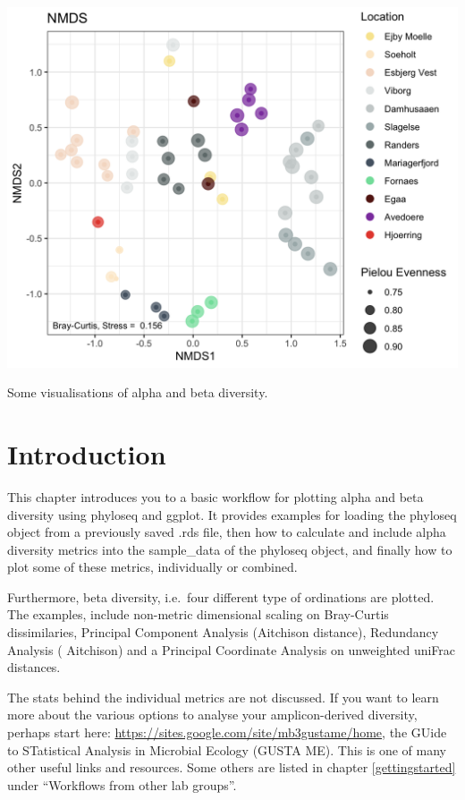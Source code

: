 \documentclass[
]{book}
\begin{document}
\includegraphics{./img/nmds-1.png}

Some visualisations of alpha and beta diversity.

\hypertarget{introduction-3}{%
\section{Introduction}\label{introduction-3}}

This chapter introduces you to a basic workflow for plotting alpha and beta diversity using phyloseq and ggplot. It provides examples for loading the phyloseq object from a previously saved .rds file, then how to calculate and include alpha diversity metrics into the sample\_data of the phyloseq object, and finally how to plot some of these metrics, individually or combined.

Furthermore, beta diversity, i.e.~four different type of ordinations are plotted. The examples, include non-metric dimensional scaling on Bray-Curtis dissimilaries, Principal Component Analysis (Aitchison distance), Redundancy Analysis ( Aitchison) and a Principal Coordinate Analysis on unweighted uniFrac distances.

The stats behind the individual metrics are not discussed. If you want to learn more about the various options to analyse your amplicon-derived diversity, perhaps start here: \url{https://sites.google.com/site/mb3gustame/home}, the GUide to STatistical Analysis in Microbial Ecology (GUSTA ME). This is one of many other useful links and resources. Some others are listed in chapter \ref{gettingstarted} under ``Workflows from other lab groups''.
\end{document}
